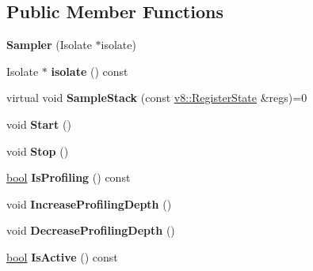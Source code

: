 \subsection*{Public Member Functions}
\begin{DoxyCompactItemize}
\item 
\mbox{\label{classv8_1_1sampler_1_1Sampler_a5b5eec9d67a2d670bd5b153100f18b80}} 
{\bfseries Sampler} (Isolate $\ast$isolate)
\item 
\mbox{\label{classv8_1_1sampler_1_1Sampler_a6c4f2fb7b802fbc72e147e8fe9993dd1}} 
Isolate $\ast$ {\bfseries isolate} () const
\item 
\mbox{\label{classv8_1_1sampler_1_1Sampler_a8956c1936909b7e4ffffd02834185b44}} 
virtual void {\bfseries Sample\+Stack} (const \mbox{\hyperlink{structv8_1_1RegisterState}{v8\+::\+Register\+State}} \&regs)=0
\item 
\mbox{\label{classv8_1_1sampler_1_1Sampler_aae6b602b48bcc6ee5bae419c4294f277}} 
void {\bfseries Start} ()
\item 
\mbox{\label{classv8_1_1sampler_1_1Sampler_ae1993183cd62ec3b809a818096a3a2c0}} 
void {\bfseries Stop} ()
\item 
\mbox{\label{classv8_1_1sampler_1_1Sampler_a810bb5518d9287a3f9a07de7a9011a5c}} 
\mbox{\hyperlink{classbool}{bool}} {\bfseries Is\+Profiling} () const
\item 
\mbox{\label{classv8_1_1sampler_1_1Sampler_a635aeffd4484d8f939d24aba13d2f556}} 
void {\bfseries Increase\+Profiling\+Depth} ()
\item 
\mbox{\label{classv8_1_1sampler_1_1Sampler_a55392c6d365c3340eba4c42b39889d20}} 
void {\bfseries Decrease\+Profiling\+Depth} ()
\item 
\mbox{\label{classv8_1_1sampler_1_1Sampler_a1a60129bc323a452d01150e62e6d50a9}} 
\mbox{\hyperlink{classbool}{bool}} {\bfseries Is\+Active} () const
\item 

\end{DoxyCompactItemize}
